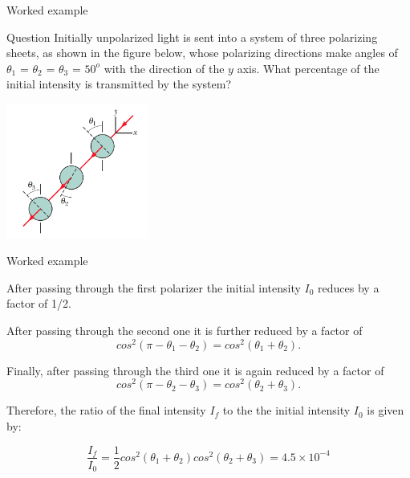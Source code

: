 {
\problemslide

\begin{frame}{Worked example}

\begin{blockexmplque}{Question}
  Initially unpolarized light is sent into a system
  of three polarizing sheets, as shown in the figure below,
  whose polarizing directions make angles
  of $\theta_1$ = $\theta_2$ = $\theta_3$ = $50^o$ with
  the direction of the $y$ axis. What percentage
  of the initial intensity is transmitted by the system?\\

  \begin{center}
   \includegraphics[width=0.35\textwidth]{./images/problems/lect10_3filters}\\
  \end{center}
\end{blockexmplque}

\end{frame}

%
%
%
%

\begin{frame}{Worked example}

  After passing through the first polarizer the initial intensity $I_0$
  reduces by a factor of 1/2.

  After passing through the second one it is further reduced by a factor of
  \begin{equation*}
   cos^2(\pi - \theta_1 - \theta_2) = cos^2(\theta_1 + \theta_2).
  \end{equation*}

  Finally, after passing through the third one it is again reduced by
  a factor of
  \begin{equation*}
   cos^2(\pi - \theta_2 - \theta_3) = cos^2(\theta_2 + \theta_3).
  \end{equation*}

  Therefore, the ratio of the final intensity $I_f$ to the the initial intensity $I_0$
  is given by:

  \begin{equation*}
     \frac{I_f}{I_0} = \frac{1}{2} cos^2(\theta_1 + \theta_2) cos^2(\theta_2 + \theta_3) = 4.5 \times 10^{-4}
  \end{equation*}

\end{frame}

} %

